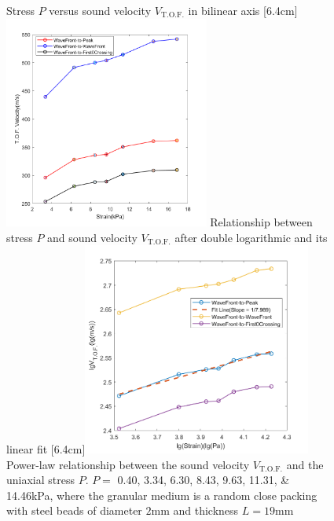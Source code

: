 \begin{figure}[!hbtp]
  \centering
                  {Stress $P$ versus sound velocity $V_{\text{T.O.F.}}$ in bilinear axis}%
                  [6.4cm]{\includegraphics[height=7cm]{figures/2_strain_vs_velocity_20mm_1.png}}
  \hspace{1cm}
                  {Relationship between stress $P$ and sound velocity $V_{\text{T.O.F.}}$ after double logarithmic  and its linear fit}%
                  [6.4cm]{\includegraphics[height=7cm]{figures/2_strain_vs_velocity_20mm_2.png}}
                  {Power-law relationship between the sound velocity $V_{\text{T.O.F.}}$ and the uniaxial stress $P$. $P =$ \numlist[
                    list-final-separator = { and }
                  ]{0.40;3.34;6.30;8.43;9.63;11.31;14.46}\unit{\kilo\pascal}, where the granular medium is a random close packing with steel beads of diameter $2\unit{\milli\meter}$ and thickness $L = 19$\unit{\milli\meter}}
  \label{fig:normalized_width_versus_P}
\end{figure}

